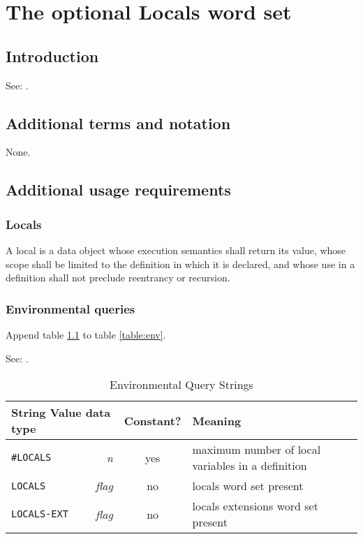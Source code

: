 \chapter{The optional Locals word set} %

\section{Introduction} %

See: .

\section{Additional terms and notation} %

None.

\section{Additional usage requirements} %

\subsection{Locals} %

A local is a data object whose execution semantics shall return its
value, whose scope shall be limited to the definition in which it is
declared, and whose use in a definition shall not preclude reentrancy
or recursion.

\subsection{Environmental queries} %

Append table \ref{local:env} to table \ref{table:env}.

See: .

\begin{table}[h]
  \begin{center}
	\caption{Environmental Query Strings}
	\label{local:env}
	\begin{tabular}{p{9em}rcp{}}
		\hline\hline
		\multicolumn{2}{l}{String \hfill Value data type} & Constant? & Meaning \\
		\hline
		\texttt{\#LOCALS}		& \emph{n}	& yes	&
			maximum number of local variables in a definition \\
		\texttt{LOCALS}	& \emph{flag}	& no	&
			locals word set present \\
		\texttt{LOCALS-EXT}	& \emph{flag}	& no	&
			locals extensions word set present \\
		\hline\hline
	\end{tabular}
  \end{center}
\end{table}

